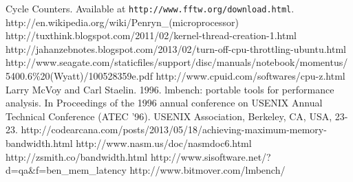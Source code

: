 \documentclass{article} %
\begin{document}
\begin{thebibliography}{1}

 Cycle Counters. Available at {\tt http://www.fftw.org/download.html}.
\bibitem{}http://en.wikipedia.org/wiki/Penryn\_(microprocessor)
\bibitem{}http://tuxthink.blogspot.com/2011/02/kernel-thread-creation-1.html
\bibitem{}http://jahanzebnotes.blogspot.com/2013/02/turn-off-cpu-throttling-ubuntu.html
\bibitem{}http://www.seagate.com/staticfiles/support/disc/manuals/notebook/momentus/5400.6\%20(Wyatt)/100528359e.pdf
\bibitem{}http://www.cpuid.com/softwares/cpu-z.html
\bibitem{}Larry McVoy and Carl Staelin. 1996. lmbench: portable tools for performance analysis. In Proceedings of the 1996 annual conference on USENIX Annual Technical Conference (ATEC '96). USENIX Association, Berkeley, CA, USA, 23-23.
\bibitem{}http://codearcana.com/posts/2013/05/18/achieving-maximum-memory-bandwidth.html
\bibitem{}http://www.nasm.us/doc/nasmdoc6.html
\bibitem{}http://zsmith.co/bandwidth.html
\bibitem{}http://www.sisoftware.net/?d=qa\&f=ben\_mem\_latency
\bibitem{}http://www.bitmover.com/lmbench/

\end{thebibliography}
\end{document}
